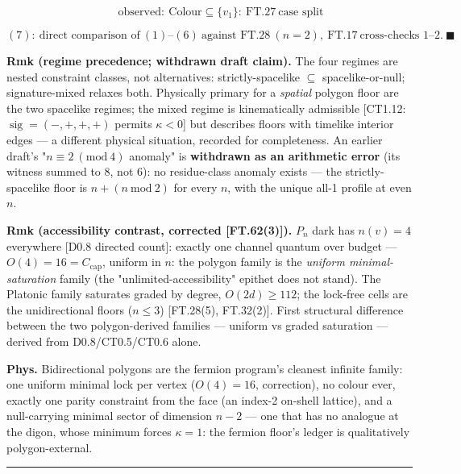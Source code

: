 \begin{theorem}
\[
\qquad \text{observed}:\ \mathrm{Colour}\subseteq\{v_1\}:\ \mathrm{FT.27}\ \text{case split}
\]

\[
(7):\ \text{direct comparison of}\ (1)\text{--}(6)\ \text{against FT.28}\ (n{=}2),\ \mathrm{FT.17}\ \text{cross-checks 1--2}.\ \blacksquare
\]

\textbf{Rmk (regime precedence; withdrawn draft claim).} The four regimes are nested constraint classes, not alternatives: strictly-spacelike $\subseteq$ spacelike-or-null; signature-mixed relaxes both. Physically primary for a \textit{spatial} polygon floor are the two spacelike regimes; the mixed regime is kinematically admissible [CT1.12: $\operatorname{sig}=(-,+,+,+)$ permits $\kappa<0$] but describes floors with timelike interior edges — a different physical situation, recorded for completeness. An earlier draft's "$n\equiv2\ (\mathrm{mod}\ 4)$ anomaly" is \textbf{withdrawn as an arithmetic error} (its witness summed to $8$, not $6$): no residue-class anomaly exists — the strictly-spacelike floor is $n+(n\ \mathrm{mod}\ 2)$ for every $n$, with the unique all-1 profile at even $n$.

\textbf{Rmk (accessibility contrast, corrected [FT.62(3)]).} $P_n$ dark has $n(v)=4$ everywhere [D0.8 directed count]: exactly one channel quantum over budget — $O(4)=16=C_{\mathrm{cap}}$, uniform in $n$: the polygon family is the \textit{uniform minimal-saturation} family (the "unlimited-accessibility" epithet does not stand). The Platonic family saturates graded by degree, $O(2d)\ge112$; the lock-free cells are the unidirectional floors ($n\le3$) [FT.28(5), FT.32(2)]. First structural difference between the two polygon-derived families — uniform vs graded saturation — derived from D0.8/CT0.5/CT0.6 alone.

\textbf{Phys.} Bidirectional polygons are the fermion program's cleanest infinite family: one uniform minimal lock per vertex ($O(4)=16$, correction), no colour ever, exactly one parity constraint from the face (an index-2 on-shell lattice), and a null-carrying minimal sector of dimension $n-2$ — one that has no analogue at the digon, whose minimum forces $\kappa=1$: the fermion floor's ledger is qualitatively polygon-external.

\vspace{2pt}\noindent\rule{\textwidth}{0.4pt}\vspace{2pt}

\end{theorem}

